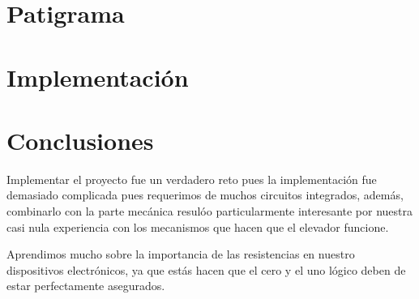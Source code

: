 \documentclass{mylib/reporte}
\begin{document}
\section{Patigrama}


\section{Implementación}



\section{Conclusiones}

Implementar el proyecto fue un verdadero reto pues la implementación fue demasiado complicada pues requerimos de muchos circuitos integrados, además, combinarlo con la parte mecánica resulóo particularmente interesante por nuestra casi nula experiencia con los mecanismos que hacen que el elevador funcione.

Aprendimos mucho sobre la importancia de las resistencias en nuestro dispositivos electrónicos, ya que estás hacen que el cero y el uno lógico deben de estar perfectamente asegurados.
\end{document}
